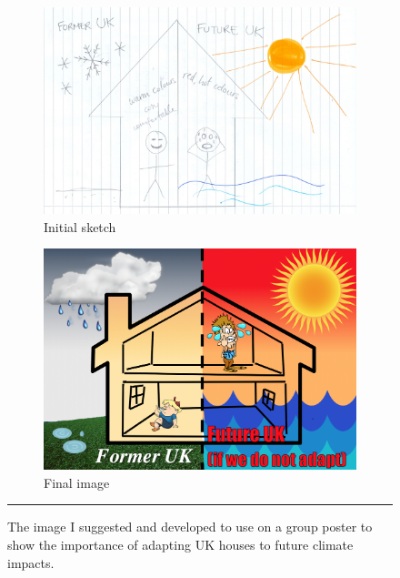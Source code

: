 \begin{figure}[htbp]
    \centering
        \begin{subfigure}{.49\textwidth}
          \centering
          \includegraphics[width=\textwidth]{figures/sketch.PNG}
          \caption{Initial sketch}
          \label{fig:Sketch01}
        \end{subfigure}
        \begin{subfigure}{.47\textwidth}
          \centering
          \includegraphics[width=\textwidth]{figures/eposter_sketch_2.png}
          \caption{Final image}
          \label{fig:Sketch02}
        \end{subfigure}
    \rule{\textwidth}{0.5pt} %
    \caption[\CCSA \space poster image.]{The image I suggested and developed to use on a group poster to show the importance of adapting UK houses to future climate impacts.}
    \label{fig:Sketch}
\end{figure}